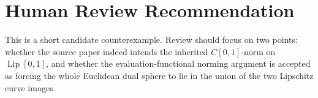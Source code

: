 \documentclass[11pt]{article}
\DeclareMathOperator{\Lip}{Lip}
\begin{document}
\section*{Human Review Recommendation}

This is a short candidate counterexample.  Review should focus on two points: whether the source paper indeed intends the inherited \(C[0,1]\)-norm on \(\Lip[0,1]\), and whether the evaluation-functional norming argument is accepted as forcing the whole Euclidean dual sphere to lie in the union of the two Lipschitz curve images.
\end{document}
